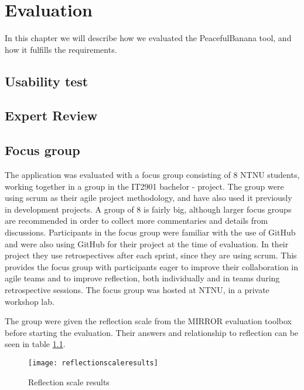 \chapter{Evaluation}
In this chapter we will describe how we evaluated the PeacefulBanana tool, and how it fulfills the requirements.


\section{Usability test}

\section{Expert Review}


\section{Focus group}
The application was evaluated with a focus group consisting of 8 NTNU students, working together in a group in the IT2901 bachelor - project. The group were using scrum as their agile project methodology, and have also used it previously in development projects. A group of 8 is fairly big, although larger focus groups are recommended in order to collect more commentaries and details from discussions\citep{morgan1998planning}. Participants in the focus group were familiar with the use of GitHub and were also using GitHub for their project at the time of evaluation. In their project they use retrospectives after each sprint, since they are using scrum. This provides the focus group with participants eager to improve their collaboration in agile teams and to improve reflection, both individually and in teams during retrospective sessions. The focus group was hosted at NTNU, in a private workshop lab. 

The group were given the reflection scale from the MIRROR evaluation toolbox before starting the evaluation. Their answers and relationship to reflection can be seen in table \ref{reflectionscaleresults}. 
\begin{figure}[H]
\centering
	\texttt{[image: reflectionscaleresults]}
\caption{Reflection scale results}
\label{reflectionscaleresults}
\end{figure}
% 
%
